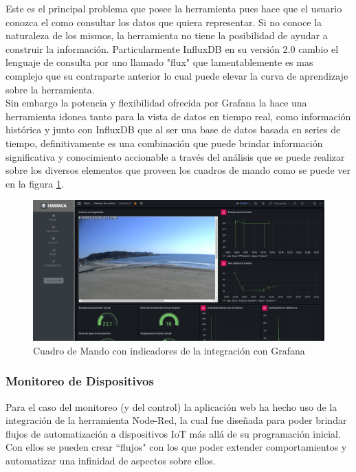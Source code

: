 Este es el principal problema que posee la herramienta pues hace que el usuario conozca el como consultar  los datos que quiera representar. Si no conoce la naturaleza de los mismos, la herramienta no tiene la posibilidad de ayudar a construir la información. Particularmente InfluxDB en su versión 2.0 cambio el lenguaje de consulta por uno llamado "flux" que lamentablemente es mas complejo que su contraparte anterior lo cual puede elevar la curva de aprendizaje sobre la herramienta.\\

Sin embargo la potencia y flexibilidad ofrecida por Grafana la hace una herramienta idonea tanto para la vista de datos en tiempo real, como información histórica y junto con InfluxDB que al ser una base de datos basada en series de tiempo, definitivamente es una combinación que puede brindar información significativa y conocimiento accionable a través del análisis que se puede realizar sobre los diversos elementos que proveen los cuadros de mando como se puede ver en la figura \ref{fig:hamaca_grafana_panel}.  
\begin{figure}[htb]
\centering
\includegraphics[scale=0.23]{./Figuras/hamaca_grafana_panel.png}
\caption{Cuadro de Mando con indicadores de la integración con Grafana}
\label{fig:hamaca_grafana_panel}
\vspace*{-10pt}
\end{figure}

\subsubsection{Monitoreo de Dispositivos}
Para el caso del monitoreo (y del control) la aplicación web ha hecho uso de la integración de la herramienta Node-Red, la cual fue diseñada para poder brindar flujos de automatización a dispositivos IoT más allá de su programación inicial. Con ellos se pueden crear ``flujos" con los que poder extender comportamientos y automatizar una infinidad de aspectos sobre ellos. 

